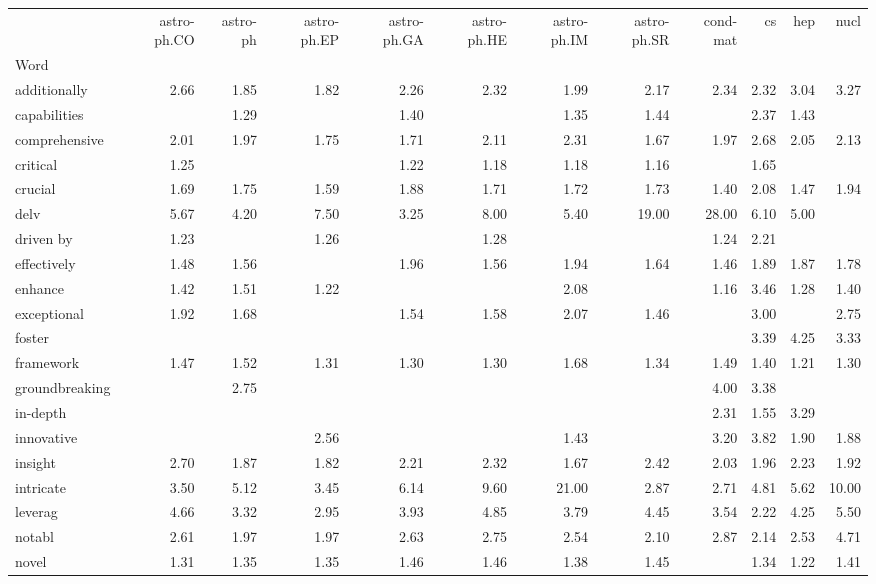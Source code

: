 \begin{tabular}{lrrrrrrrrrrr}
\toprule
 & astro-ph.CO & astro-ph & astro-ph.EP & astro-ph.GA & astro-ph.HE & astro-ph.IM & astro-ph.SR & cond-mat & cs & hep & nucl \\
Word &  &  &  &  &  &  &  &  &  &  &  \\
\midrule
additionally & 2.66 & 1.85 & 1.82 & 2.26 & 2.32 & 1.99 & 2.17 & 2.34 & 2.32 & 3.04 & 3.27 \\
capabilities &  & 1.29 &  & 1.40 &  & 1.35 & 1.44 &  & 2.37 & 1.43 &  \\
comprehensive & 2.01 & 1.97 & 1.75 & 1.71 & 2.11 & 2.31 & 1.67 & 1.97 & 2.68 & 2.05 & 2.13 \\
critical & 1.25 &  &  & 1.22 & 1.18 & 1.18 & 1.16 &  & 1.65 &  &  \\
crucial & 1.69 & 1.75 & 1.59 & 1.88 & 1.71 & 1.72 & 1.73 & 1.40 & 2.08 & 1.47 & 1.94 \\
delv & 5.67 & 4.20 & 7.50 & 3.25 & 8.00 & 5.40 & 19.00 & 28.00 & 6.10 & 5.00 &  \\
driven by & 1.23 &  & 1.26 &  & 1.28 &  &  & 1.24 & 2.21 &  &  \\
effectively & 1.48 & 1.56 &  & 1.96 & 1.56 & 1.94 & 1.64 & 1.46 & 1.89 & 1.87 & 1.78 \\
enhance & 1.42 & 1.51 & 1.22 &  &  & 2.08 &  & 1.16 & 3.46 & 1.28 & 1.40 \\
exceptional & 1.92 & 1.68 &  & 1.54 & 1.58 & 2.07 & 1.46 &  & 3.00 &  & 2.75 \\
foster &  &  &  &  &  &  &  &  & 3.39 & 4.25 & 3.33 \\
framework & 1.47 & 1.52 & 1.31 & 1.30 & 1.30 & 1.68 & 1.34 & 1.49 & 1.40 & 1.21 & 1.30 \\
groundbreaking &  & 2.75 &  &  &  &  &  & 4.00 & 3.38 &  &  \\
in-depth &  &  &  &  &  &  &  & 2.31 & 1.55 & 3.29 &  \\
innovative &  &  & 2.56 &  &  & 1.43 &  & 3.20 & 3.82 & 1.90 & 1.88 \\
insight & 2.70 & 1.87 & 1.82 & 2.21 & 2.32 & 1.67 & 2.42 & 2.03 & 1.96 & 2.23 & 1.92 \\
intricate & 3.50 & 5.12 & 3.45 & 6.14 & 9.60 & 21.00 & 2.87 & 2.71 & 4.81 & 5.62 & 10.00 \\
leverag & 4.66 & 3.32 & 2.95 & 3.93 & 4.85 & 3.79 & 4.45 & 3.54 & 2.22 & 4.25 & 5.50 \\
notabl & 2.61 & 1.97 & 1.97 & 2.63 & 2.75 & 2.54 & 2.10 & 2.87 & 2.14 & 2.53 & 4.71 \\
novel & 1.31 & 1.35 & 1.35 & 1.46 & 1.46 & 1.38 & 1.45 &  & 1.34 & 1.22 & 1.41 \\

\end{tabular}
